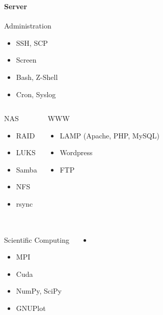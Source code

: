 \documentclass[utf8]{beamer}
\begin{document}
\begin{frame}
  \frametitle{\insertsectionhead}
  \framesubtitle{Server}

\begin{block}{Administration}
  \begin{itemize}
    \item SSH, SCP
    \item Screen
    \item Bash, Z-Shell
    \item Cron, Syslog
  \end{itemize}
\end{block}

\begin{columns}
\begin{block}{NAS}
  \begin{itemize}
    \item RAID
    \item LUKS
    \item Samba
    \item NFS
    \item rsync
  \end{itemize}
\end{block}

\begin{block}{WWW}
  \begin{itemize}
    \item LAMP (Apache, PHP, MySQL)
    \item Wordpress
    \item FTP
    \vspace{2\baselineskip}
  \end{itemize}
\end{block}
\end{columns}
\end{frame}

\begin{frame}
  \frametitle{\insertsectionhead}
  \framesubtitle{}

\begin{columns}
\begin{block}{Scientific Computing}
  \begin{itemize}
    \item MPI
    \item Cuda
    \item NumPy, SciPy
    \item GNUPlot
  \end{itemize}
\end{block}

\begin{block}{}
  \begin{itemize}
      \item
  \end{itemize}
\end{block}
\end{columns}
\end{frame}
\end{document}
